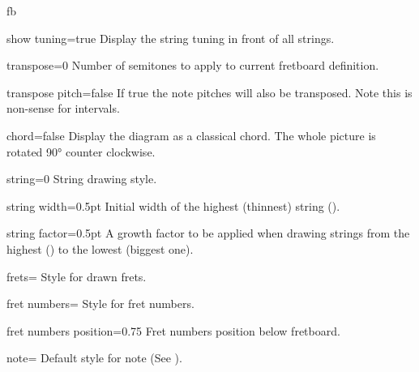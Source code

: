 \documentclass[a4paper]{article}
\begin{document}
\begin{docEnvironment}{fb}{}
\begin{docKey}[fb][]{show tuning}{=}{true}
  Display the string tuning in front of all strings.
\end{docKey}

\begin{docKey}[fb][]{transpose}{=}{0}
  Number of semitones to apply to current fretboard definition.
\end{docKey}

\begin{docKey}[fb][]{transpose pitch}{=}{false}
  If true the note pitches will also be transposed. Note this is non-sense
  for intervals.
\end{docKey}

\begin{docKey}[fb][]{chord}{=}{false}
  Display the diagram as a classical chord. The whole picture is rotated 90°
  counter clockwise.
\end{docKey}


\begin{docKey}[fb][]{string}{=}{0}
  String drawing style.
\end{docKey}

\begin{docKey}[fb][]{string width}{=}{0.5pt}
  Initial width of the highest (thinnest) string ().
\end{docKey}

\begin{docKey}[fb][]{string factor}{=}{0.5pt}
  A growth factor to be applied when drawing strings from the highest
  () to the lowest (biggest one).
\end{docKey}

\begin{docKey}[fb][]{frets}{=}{}
  Style for drawn frets.
\end{docKey}

\begin{docKey}[fb][]{fret numbers}{=}{}
  Style for fret numbers.
\end{docKey}

\begin{docKey}[fb][]{fret numbers position}{=}{0.75}
  Fret numbers position below fretboard.
\end{docKey}

\begin{docKey}[fb][]{note}{=}{}
  Default style for note (See ).
\end{docKey}


\end{docEnvironment}
\end{document}
